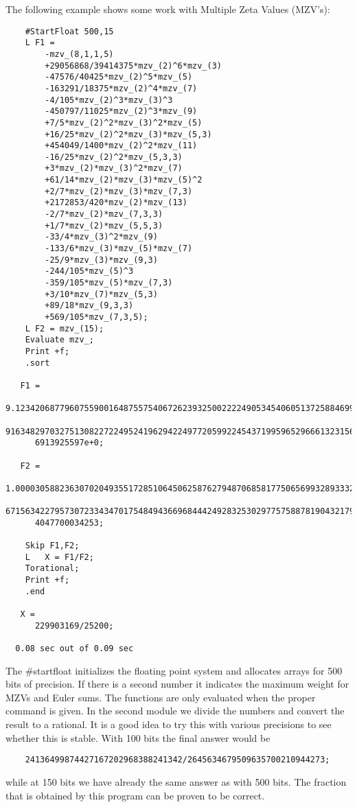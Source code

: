 The following example shows some work with Multiple Zeta Values (MZV's):
\begin{verbatim}
    #StartFloat 500,15
    L F1 =
    	-mzv_(8,1,1,5)
    	+29056868/39414375*mzv_(2)^6*mzv_(3)
    	-47576/40425*mzv_(2)^5*mzv_(5)
    	-163291/18375*mzv_(2)^4*mzv_(7)
    	-4/105*mzv_(2)^3*mzv_(3)^3
    	-450797/11025*mzv_(2)^3*mzv_(9)
    	+7/5*mzv_(2)^2*mzv_(3)^2*mzv_(5)
    	+16/25*mzv_(2)^2*mzv_(3)*mzv_(5,3)
    	+454049/1400*mzv_(2)^2*mzv_(11)
    	-16/25*mzv_(2)^2*mzv_(5,3,3)
    	+3*mzv_(2)*mzv_(3)^2*mzv_(7)
    	+61/14*mzv_(2)*mzv_(3)*mzv_(5)^2
    	+2/7*mzv_(2)*mzv_(3)*mzv_(7,3)
    	+2172853/420*mzv_(2)*mzv_(13)
    	-2/7*mzv_(2)*mzv_(7,3,3)
    	+1/7*mzv_(2)*mzv_(5,5,3)
    	-33/4*mzv_(3)^2*mzv_(9)
    	-133/6*mzv_(3)*mzv_(5)*mzv_(7)
    	-25/9*mzv_(3)*mzv_(9,3)
    	-244/105*mzv_(5)^3
    	-359/105*mzv_(5)*mzv_(7,3)
    	+3/10*mzv_(7)*mzv_(5,3)
    	+89/18*mzv_(9,3,3)
    	+569/105*mzv_(7,3,5);
    L F2 = mzv_(15);
    Evaluate mzv_;
    Print +f;
    .sort

   F1 =
      9.1234206877960755900164875575406726239325002222490534540605137258846994\
      916348297032751308227224952419629422497720599224543719959652966613231560\
      6913925597e+0;

   F2 =
      1.0000305882363070204935517285106450625876279487068581775065699328933322\
      671563422795730723343470175484943669684442492832530297757588781904321794\
      4047700034253;

    Skip F1,F2;
    L	X = F1/F2;
    Torational;
    Print +f;
    .end

   X =
      229903169/25200;

  0.08 sec out of 0.09 sec
\end{verbatim}
The \#startfloat initializes the floating point system and allocates arrays 
for 500 bits of precision. If there is a second number it indicates the 
maximum weight for MZVs and Euler sums. The functions are only evaluated 
when the proper command is given. In the second module we divide the 
numbers and convert the result to a rational. It is a good idea to try this 
with various precisions to see whether this is stable. With 100 bits the 
final answer would be
\begin{verbatim}
    24136499874427167202968388241342/2645634679509635700210944273;
\end{verbatim}
while at 150 bits we have already the same answer as with 500 bits. The 
fraction that is obtained by this program can be proven to be correct.
\vspace{3mm}

